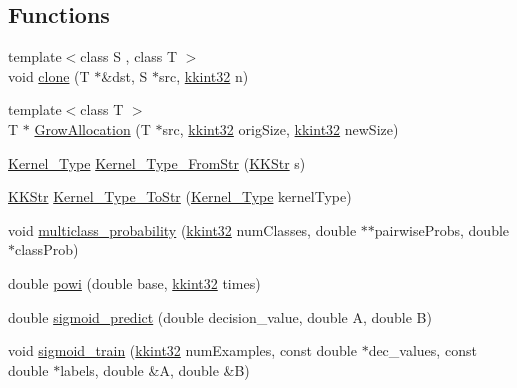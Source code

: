 \subsection*{Functions}
\begin{DoxyCompactItemize}
\item 
{\footnotesize template$<$class S , class T $>$ }\\void \hyperlink{namespace_s_v_m289___m_f_s_a24fe982127a2481d42534c0b399fb4e8}{clone} (T $\ast$\&dst, S $\ast$src, \hyperlink{namespace_k_k_b_a8fa4952cc84fda1de4bec1fbdd8d5b1b}{kkint32} n)
\item 
{\footnotesize template$<$class T $>$ }\\T $\ast$ \hyperlink{namespace_s_v_m289___m_f_s_ad07b42212b658e4ce40e62ef077d6f02}{Grow\+Allocation} (T $\ast$src, \hyperlink{namespace_k_k_b_a8fa4952cc84fda1de4bec1fbdd8d5b1b}{kkint32} orig\+Size, \hyperlink{namespace_k_k_b_a8fa4952cc84fda1de4bec1fbdd8d5b1b}{kkint32} new\+Size)
\item 
\hyperlink{namespace_s_v_m289___m_f_s_ad985d190115342f6434e0ed8816b6e29}{Kernel\+\_\+\+Type} \hyperlink{namespace_s_v_m289___m_f_s_af159fcbaa5a7d27c95f0d0e04da90d5e}{Kernel\+\_\+\+Type\+\_\+\+From\+Str} (\hyperlink{class_k_k_b_1_1_k_k_str}{K\+K\+Str} s)
\item 
\hyperlink{class_k_k_b_1_1_k_k_str}{K\+K\+Str} \hyperlink{namespace_s_v_m289___m_f_s_acb87b87039ae2f543109394ca6cecdef}{Kernel\+\_\+\+Type\+\_\+\+To\+Str} (\hyperlink{namespace_s_v_m289___m_f_s_ad985d190115342f6434e0ed8816b6e29}{Kernel\+\_\+\+Type} kernel\+Type)
\item 
void \hyperlink{namespace_s_v_m289___m_f_s_aefc1f8c96f1e8adeff7d73b2cc7c6520}{multiclass\+\_\+probability} (\hyperlink{namespace_k_k_b_a8fa4952cc84fda1de4bec1fbdd8d5b1b}{kkint32} num\+Classes, double $\ast$$\ast$pairwise\+Probs, double $\ast$class\+Prob)
\item 
double \hyperlink{namespace_s_v_m289___m_f_s_ac9cc81b09c9e5320dd937f9eb86f00b2}{powi} (double base, \hyperlink{namespace_k_k_b_a8fa4952cc84fda1de4bec1fbdd8d5b1b}{kkint32} times)
\item 
double \hyperlink{namespace_s_v_m289___m_f_s_ae9ae68befb58132b942d39cd83817bc8}{sigmoid\+\_\+predict} (double decision\+\_\+value, double A, double B)
\item 
void \hyperlink{namespace_s_v_m289___m_f_s_a4358d6f463de7ed0b26fa0bc2c184240}{sigmoid\+\_\+train} (\hyperlink{namespace_k_k_b_a8fa4952cc84fda1de4bec1fbdd8d5b1b}{kkint32} num\+Examples, const double $\ast$dec\+\_\+values, const double $\ast$labels, double \&A, double \&B)
$$
\end{DoxyCompactItemize}
